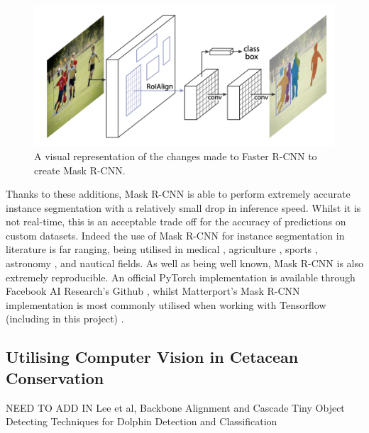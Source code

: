 \begin{figure}
	\begin{center}
		\includegraphics[scale=0.3]{Chapter2/figs/mask-r-cnn-changes.png}
	\end{center}
	\caption{A visual representation of the changes made to Faster R-CNN to create Mask R-CNN. \cite{he_mask_2017}}
	\label{fig:mask-r-cnn-changes}
\end{figure}

Thanks to these additions, Mask R-CNN is able to perform extremely accurate instance segmentation with a relatively small drop in inference speed. Whilst it is not real-time, this is an acceptable trade off for the accuracy of predictions on custom datasets. Indeed the use of Mask R-CNN for instance segmentation in literature is far ranging, being utilised in medical \cite{rohit_malhotra_autonomous_2018, chiao_detection_2019, liu_segmentation_2018, anantharaman_utilizing_2018}, agriculture \cite{qiao_cattle_2019, zhao_comparing_2018, lee_potato_2020, chu_deepapple_2020}, sports \cite{buric_ball_2018, pobar_detection_2019, nguyen_hand_2018}, astronomy \cite{burke_deblending_2019}, and nautical \cite{nie_inshore_2018, hong_trashcan_2020} fields. As well as being well known, Mask R-CNN is also extremely reproducible. An official PyTorch implementation is available through Facebook AI Research's Github \cite{wu_detectron2_2020}, whilst Matterport's Mask R-CNN implementation is most commonly utilised when working with Tensorflow (including in this project) \cite{waleed_mask_2017}.

\subsection{Utilising Computer Vision in Cetacean Conservation}\label{ch:Background,sec:cetaceanDetection}

NEED TO ADD IN Lee et al, Backbone Alignment and Cascade Tiny Object Detecting Techniques for Dolphin Detection and Classification

